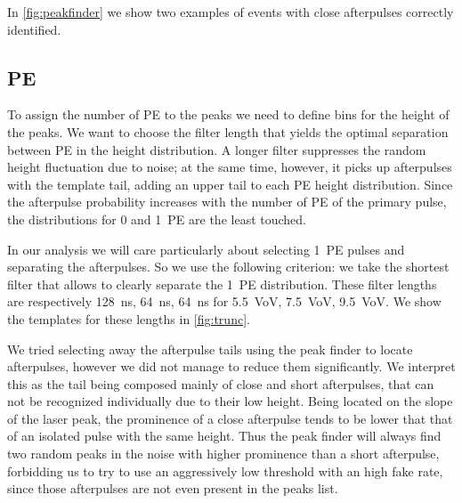 In \autoref{fig:peakfinder} we show two examples of events with close
afterpulses correctly identified.

\begin{figure}
    
    
    
\end{figure}

\subsection{PE}
\label{sec:pe}

To assign the number of PE to the peaks we need to define bins for the height
of the peaks. We want to choose the filter length that yields the optimal
separation between PE in the height distribution. A longer filter suppresses
the random height fluctuation due to noise; at the same time, however, it picks
up afterpulses with the template tail, adding an upper tail to each PE height
distribution. Since the afterpulse probability increases with the number of PE
of the primary pulse, the distributions for 0 and 1~PE are the least touched.

In our analysis we will care particularly about selecting 1~PE pulses and
separating the afterpulses. So we use the following criterion: we take the
shortest filter that allows to clearly separate the 1~PE distribution. These
filter lengths are respectively \SI{128}{ns}, \SI{64}{ns}, \SI{64}{ns} for
\SI{5.5}{VoV}, \SI{7.5}{VoV}, \SI{9.5}{VoV}. We show the templates for these
lengths in \autoref{fig:trunc}.

\begin{figure}

    
    
\end{figure}

We tried selecting away the afterpulse tails using the peak finder to locate
afterpulses, however we did not manage to reduce them significantly. We
interpret this as the tail being composed mainly of close and short
afterpulses, that can not be recognized individually due to their low height.
Being located on the slope of the laser peak, the prominence of a close
afterpulse tends to be lower that that of an isolated pulse with the same
height. Thus the peak finder will always find two random peaks in the noise
with higher prominence than a short afterpulse, forbidding us to try to use an
aggressively low threshold with an high fake rate, since those afterpulses are
not even present in the peaks list.

